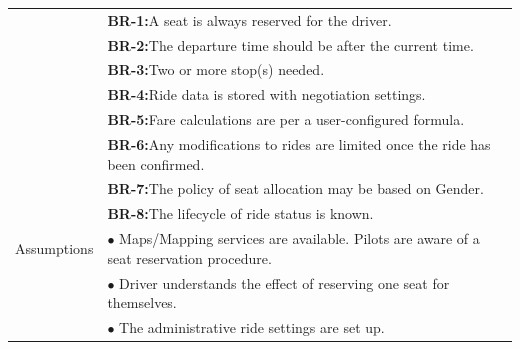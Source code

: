 \begin{longtable}{|>{\raggedright\arraybackslash}p{4cm}|>{\raggedright\arraybackslash}p{11cm}|}
& \textbf{BR-1:}A seat is always reserved for the driver.\\
& \textbf{BR-2:}The departure time should be after the current time.\\
& \textbf{BR-3:}Two or more stop(s) needed.\\
& \textbf{BR-4:}Ride data is stored with negotiation settings.\\
& \textbf{BR-5:}Fare calculations are per a user-configured formula.\\
& \textbf{BR-6:}Any modifications to rides are limited once the ride has been confirmed.\\
& \textbf{BR-7:}The policy of seat allocation may be based on Gender.\\
& \textbf{BR-8:}The lifecycle of ride status is known.\\
\hline
Assumptions & $\bullet$ Maps/Mapping services are available. Pilots are aware of a seat reservation procedure. \\
& $\bullet$ Driver understands the effect of reserving one seat for themselves. \\
& $\bullet$ The administrative ride settings are set up. \\
\end{longtable}


